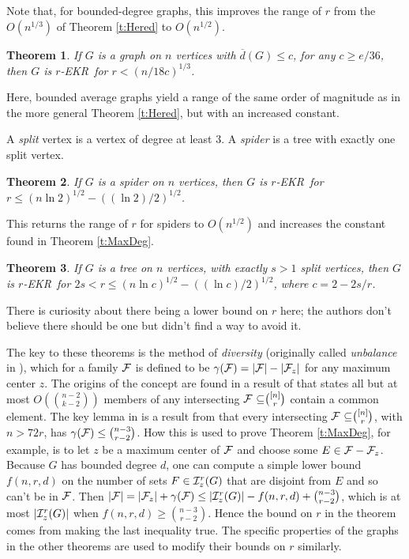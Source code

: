 \documentclass{article}
\newtheorem{thm}{Theorem}%
\def\c{{\gamma}}
\def\cF{{\cal F}}
\def\cI{{\cal I}}
\def\od{{\overline{d}}}
\def\ekr{{\sf EKR}}
\def\sse{{\subseteq}}
\begin{document}
Note that, for bounded-degree graphs, this improves the range of $r$ from the $O(n^{1/3})$ of Theorem \ref{t:Hered} to $O(n^{1/2})$.

\begin{thm}
\label{t:MaxAveDeg}
If $G$ is a graph on $n$ vertices with $\od(G)\le c$, for any $c\ge e/36$, then $G$ is $r$-\ekr\ for $r < (n/18c)^{1/3}$. 
\end{thm}

Here, bounded average graphs yield a range of the same order of magnitude as in the more general Theorem \ref{t:Hered}, but with an increased constant.

A {\it split} vertex is a vertex of degree at least 3.
A {\it spider} is a tree with exactly one split vertex.

\begin{thm}
\label{t:Spiders}
If $G$ is a spider on $n$ vertices, then $G$ is $r$-\ekr\ for $r\le (n\ln 2)^{1/2}-((\ln 2)/2)^{1/2}$.
\end{thm}

This returns the range of $r$ for spiders to $O(n^{1/2})$ and increases the constant found in Theorem \ref{t:MaxDeg}.

\begin{thm}
\label{t:Trees}
If $G$ is a tree on $n$ vertices, with exactly $s>1$ split vertices, then $G$ is $r$-\ekr\ for $2s < r \le (n\ln c)^{1/2}-((\ln c)/2)^{1/2}$, where $c=2-2s/r$.
\end{thm}

There is curiosity about there being a lower bound on $r$ here; the authors don't believe there should be one but didn't find a way to avoid it.

The key to these theorems is the method of {\it diversity} (originally called {\it unbalance} in \cite{LemoPalm}), which for a family $\cF$ is defined to be $\c(\cF) = |\cF|-|\cF_z|$ for any maximum center $z$.
The origins of the concept are found in a result of \cite{DinuFrie} that states all but at most $O(\binom{n-2}{k-2})$ members of any intersecting $\cF\ \sse \binom{[n]}{r}$ contain a common element.
The key lemma in \cite{FranHurl} is a result from \cite{FranklDiversity} that every intersecting $\cF\ \sse\binom{[n]}{r}$, with $n>72r$, has $\c(\cF)\le\binom{n-3}{r-2}$.
How this is used to prove Theorem \ref{t:MaxDeg}, for example, is to let $z$ be a maximum center of $\cF$ and choose some $E\in\cF-\cF_z$.
Because $G$ has bounded degree $d$, one can compute a simple lower bound $f(n,r,d)$ on the number of sets $F\in\cI_z^r(G)$ that are disjoint from $E$ and so can't be in $\cF$.
Then $|\cF| = |\cF_z|+\c(\cF) \le |\cI_z^r(G)| - f(n,r,d) + \binom{n-3}{r-2}$, which is at most $|\cI_z^r(G)|$ when $f(n,r,d)\ge \binom{n-3}{r-2}$.
Hence the bound on $r$ in the theorem comes from making the last inequality true.
The specific properties of the graphs in the other theorems are used to modify their bounds on $r$ similarly.
\end{document}
